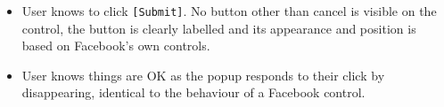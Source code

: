 \begin{desc}
\begin{itemize}
            \item User knows to click {\tt [Submit]}. No button other than cancel is visible on the control, the button is clearly labelled and its appearance and position is based on Facebook's own controls.
            
            \item User knows things are OK as the popup responds to their click by disappearing, identical to the behaviour of a Facebook control.
        
        \end{itemize}
    
\end{desc}